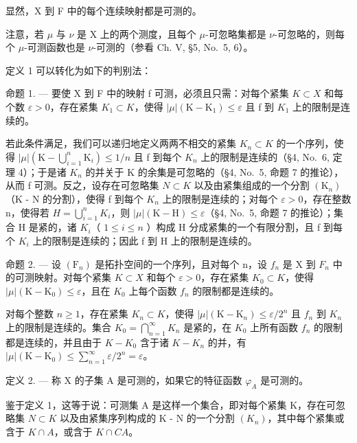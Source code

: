 显然，X 到 F 中的每个连续映射都是可测的。

注意，若 \(\mu\) 与 \(\nu\) 是 X 上的两个测度，且每个 \(\mu\)-可忽略集都是 \(\nu\)-可忽略的，则每个 \(\mu\)-可测函数也是 \(\nu\)-可测的（参看 Ch. V, §5, No.~5, 6）。

定义 1 可以转化为如下的判别法：

命题 1. --- 要使 X 到 F 中的映射 f 可测，必须且只需：对每个紧集 \(K \subset X\) 和每个数 \(\varepsilon > 0\)，存在紧集 \(K_{1} \subset K\)，使得 \(|\mu|(\mathrm{K} - \mathrm{K}_{1}) \leqslant \varepsilon\) 且 f 到 \(K_{1}\) 上的限制是连续的。

若此条件满足，我们可以递归地定义两两不相交的紧集 \(K_{n} \subset K\) 的一个序列，使得 \(|\mu|(\mathrm{K} - \bigcup_{i=1}^{n} \mathrm{K}_{i}) \leqslant 1/n\) 且 f 到每个 \(K_{n}\) 上的限制是连续的（§4, No.~6, 定理 4）；于是诸 \(K_{n}\) 的并关于 K 的余集是可忽略的（§4, No.~5, 命题 7 的推论），从而 f 可测。反之，设存在可忽略集 \(N \subset K\) 以及由紧集组成的一个分割 \((\mathrm{K}_{n})\)（K - N 的分割），使得 f 到每个 \(K_{n}\) 上的限制是连续的；对每个 \(\varepsilon > 0\)，存在整数 n，使得若 \(H = \bigcup_{i=1}^{n} K_{i}\)，则 \(|\mu|(\mathrm{K} - \mathrm{H}) \leqslant \varepsilon\)（§4, No.~5, 命题 7 的推论）；集合 H 是紧的，诸 \(K_{i}\)（ \(1 \leqslant i \leqslant n\) ）构成 H 分成紧集的一个有限分割，且 f 到每个 \(K_{i}\) 上的限制是连续的；因此 f 到 H 上的限制是连续的。

命题 2. --- 设 \((\mathrm{F}_{n})\) 是拓扑空间的一个序列，且对每个 n，设 \(f_{n}\) 是 X 到 \(F_{n}\) 中的可测映射。对每个紧集 \(K \subset X\) 和每个 \(\varepsilon > 0\)，存在紧集 \(K_{0} \subset K\)，使得 \(|\mu|(\mathrm{K} - \mathrm{K}_{0}) \leqslant \varepsilon\)，且在 \(K_{0}\) 上每个函数 \(f_{n}\) 的限制都是连续的。

对每个整数 \(n \geqslant 1\)，存在紧集 \(K_{n} \subset K\)，使得 \(|\mu|(\mathrm{K} - \mathrm{K}_{n}) \leqslant \varepsilon/2^{n}\) 且 \(f_{n}\) 到 \(K_{n}\) 上的限制是连续的。集合 \(K_{0} = \bigcap_{n=1}^{\infty} K_{n}\) 是紧的，在 \(K_{0}\) 上所有函数 \(f_{n}\) 的限制都是连续的，并且由于 \(K - K_{0}\) 含于诸 \(K - K_{n}\) 的并，有 \(|\mu|(\mathrm{K} - \mathrm{K}_{0}) \leqslant \sum_{n=1}^{\infty} \varepsilon/2^{n} = \varepsilon\)。

定义 2. --- 称 X 的子集 A 是可测的，如果它的特征函数 \(\varphi_{A}\) 是可测的。

鉴于定义 1，这等于说：可测集 A 是这样一个集合，即对每个紧集 K，存在可忽略集 \(N \subset K\) 以及由紧集序列构成的 K - N 的一个分割 \((K_{n})\)，其中每个紧集或含于 \(K \cap A\)，或含于 \(K \cap C A\)。

